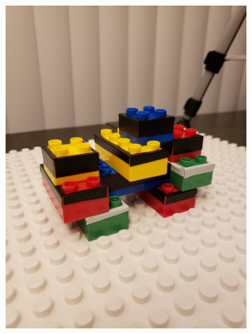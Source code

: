 \begin{figure}[H]
\begin{subfigure}{0.5\textwidth}
       \caption[{}]{\label{fig:fig_3-6d}}
    \end{subfigure}
    \begin{subfigure}{0.5\textwidth}
       \centering
       \includegraphics[width=0.8\linewidth,trim={0 10cm 0 20cm},clip]{figures/t6.jpg}
      

\end{subfigure}
\end{figure}
